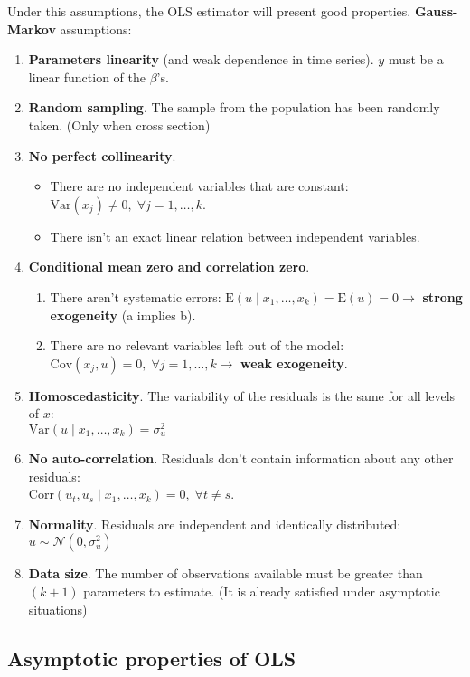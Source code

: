 \documentclass[10pt, a4paper, landscape]{extarticle}
\newcommand{\E}{\mathrm{E}}
\newcommand{\Var}{\mathrm{Var}}
\newcommand{\Cov}{\mathrm{Cov}}
\newcommand{\Corr}{\mathrm{Corr}}
\begin{document}
\begin{multicols}{3}
Under this assumptions, the OLS estimator will present good properties. \textbf{Gauss-Markov} assumptions:

\begin{enumerate}[leftmargin=*]
	\item \textbf{Parameters linearity} (and weak dependence in time series). $y$ must be a linear function of the $\beta$'s.
	\item \textbf{Random sampling}. The sample from the population has been randomly taken. (Only when cross section)
	\item \textbf{No perfect collinearity}.
	\begin{itemize}[leftmargin=*]
		\item There are no independent variables that are constant: $\Var(x_j) \neq 0, \; \forall j = 1, \ldots, k$.
		\item There isn't an exact linear relation between independent variables.
	\end{itemize}
	\item \textbf{Conditional mean zero and correlation zero}.
	\begin{enumerate}[leftmargin=*, label=\alph*.]
		\item There aren't systematic errors: $\E(u \mid x_1, \ldots, x_k) = \E(u) = 0 \rightarrow$ \textbf{strong exogeneity} (a implies b).
		\item There are no relevant variables left out of the model: $\Cov(x_j, u) = 0, \; \forall j = 1, \ldots, k \rightarrow$ \textbf{weak exogeneity}.
	\end{enumerate}
	\item \textbf{Homoscedasticity}. The variability of the residuals is the same for all levels of $x$: \\ $\Var(u \mid x_1, \ldots, x_k) = \sigma^2_u$
	\item \textbf{No auto-correlation}. Residuals don't contain information about any other residuals: \\ $\Corr(u_t, u_s \mid x_1, \ldots, x_k) = 0, \; \forall t \neq s$.
	\item \textbf{Normality}. Residuals are independent and identically distributed: $u \sim \mathcal{N}(0, \sigma^2_u)$
	\item \textbf{Data size}. The number of observations available must be greater than $(k + 1)$ parameters to estimate. (It is already satisfied under asymptotic situations)		
\end{enumerate}

\subsection*{Asymptotic properties of OLS}


\end{multicols}
\end{document}
